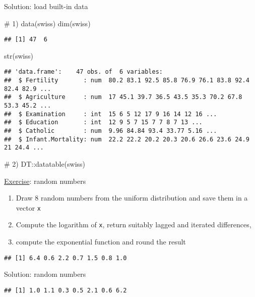 \documentclass[
  10pt,
  ignorenonframetext,
]{beamer}
\newenvironment{Shaded}{}{}
\newcommand{\CommentTok}[1]{\textcolor[rgb]{0.00,0.50,0.00}{#1}}
\newcommand{\KeywordTok}[1]{\textcolor[rgb]{0.00,0.00,1.00}{#1}}
\newcommand{\NormalTok}[1]{#1}
\newcommand{\OperatorTok}[1]{#1}
\providecommand{\tightlist}{%
  \setlength{\itemsep}{0pt}\setlength{\parskip}{0pt}}
\begin{document}
\begin{frame}[fragile]{Solution: load built-in data}
\protect\hypertarget{solution-load-built-in-data}{}

\begin{Shaded}
\begin{Highlighting}[]
\CommentTok{# 1)}
\KeywordTok{data}\NormalTok{(swiss) }
\KeywordTok{dim}\NormalTok{(swiss) }
\end{Highlighting}
\end{Shaded}

\begin{verbatim}
## [1] 47  6
\end{verbatim}

\begin{Shaded}
\begin{Highlighting}[]
\KeywordTok{str}\NormalTok{(swiss) }
\end{Highlighting}
\end{Shaded}

\begin{verbatim}
## 'data.frame':    47 obs. of  6 variables:
##  $ Fertility       : num  80.2 83.1 92.5 85.8 76.9 76.1 83.8 92.4 82.4 82.9 ...
##  $ Agriculture     : num  17 45.1 39.7 36.5 43.5 35.3 70.2 67.8 53.3 45.2 ...
##  $ Examination     : int  15 6 5 12 17 9 16 14 12 16 ...
##  $ Education       : int  12 9 5 7 15 7 7 8 7 13 ...
##  $ Catholic        : num  9.96 84.84 93.4 33.77 5.16 ...
##  $ Infant.Mortality: num  22.2 22.2 20.2 20.3 20.6 26.6 23.6 24.9 21 24.4 ...
\end{verbatim}

\begin{Shaded}
\begin{Highlighting}[]
\CommentTok{# 2)}
\NormalTok{DT}\OperatorTok{::}\KeywordTok{datatable}\NormalTok{(swiss)}
\end{Highlighting}
\end{Shaded}

\end{frame}

\begin{frame}[fragile]{\href{https://www.datacamp.com/community/tutorials/pipe-r-tutorial}{Exercise}:
random numbers}
\protect\hypertarget{exercise-random-numbers}{}

\begin{enumerate}
[1)]
\tightlist
\item
  Draw 8 random numbers from the uniform distribution and save them in a
  vector \texttt{x}
\item
  Compute the logarithm of \texttt{x}, return suitably lagged and
  iterated differences,
\item
  compute the exponential function and round the result
\end{enumerate}

\begin{verbatim}
## [1] 6.4 0.6 2.2 0.7 1.5 0.8 1.0
\end{verbatim}

\end{frame}

\begin{frame}[fragile]{Solution: random numbers}
\protect\hypertarget{solution-random-numbers}{}

\begin{verbatim}
## [1] 1.0 1.1 0.3 0.5 2.1 0.6 6.2
\end{verbatim}

\end{frame}
\end{document}
